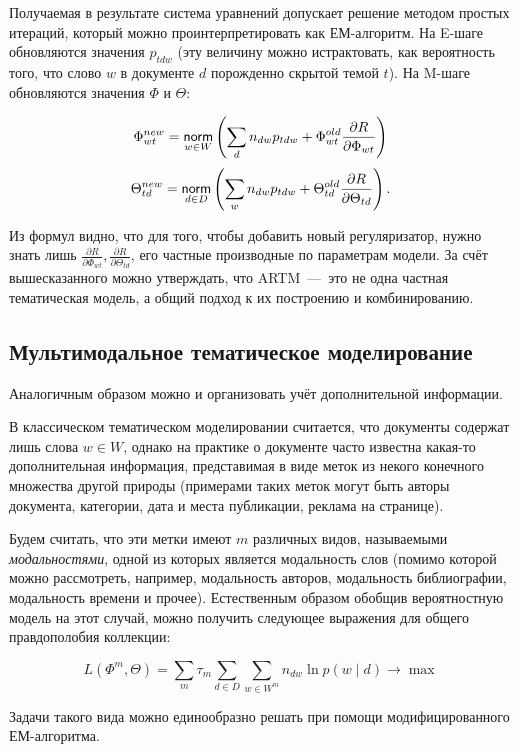 Получаемая в результате система уравнений допускает решение методом простых итераций, который можно проинтерпретировать как ЕМ-алгоритм. На E-шаге обновляются значения $p_{tdw}$ (эту величину можно истрактовать, как вероятность того, что слово $w$ в документе $d$ порожденно скрытой темой $t$). На M-шаге обновляются значения $\Phi$ и $\Theta$:

\begin{equation} \label{eq:Mstep_Theta}
\Phi_{wt}^{new} =\mathop{\mathsf{norm}}\limits_{w\in W} \left( \sum_{d} n_{dw} p_{tdw} + \Phi_{wt}^{old} \frac{\partial{R}}{\partial{\Phi_{wt}}}\right)
\end{equation}
\[
\Theta_{td}^{new}   =\mathop{\mathsf{norm}}\limits_{d\in D} \left( \sum_{w} n_{dw} p_{tdw} + \Theta_{td}^{old} \frac{\partial{R}}{\partial{\Theta_{td}}}\right).
\]
 
Из формул видно, что для того, чтобы добавить новый регуляризатор, нужно знать лишь $\frac{\partial{R}}{\partial{\Phi_{wt}}}, \frac{\partial{R}}{\partial{\Theta_{td}}}$, его частные производные по параметрам модели. За счёт вышесказанного можно утверждать, что ARTM~---~это не одна частная тематическая модель, а общий подход к их построению и комбинированию.

\subsection{Мультимодальное тематическое моделирование}

Аналогичным образом можно и организовать учёт дополнительной информации. 

В классическом тематическом моделировании считается, что документы содержат лишь слова $w \in W$, однако на практике о документе часто известна какая-то дополнительная информация, представимая в виде меток из некого конечного множества другой природы (примерами таких меток могут быть авторы документа, категории, дата и места публикации, реклама на странице). 

Будем считать, что эти метки имеют $m$ различных видов, называемыми  \textit{модальностями}, одной из которых является модальность слов (помимо которой можно рассмотреть, например, модальность авторов, модальность библиографии, модальность времени и прочее). Естественным образом обобщив вероятностную модель на этот случай, можно получить следующее выражения для общего правдополобия коллекции:

\[
L(\Phi^m, \Theta) = \sum_m \tau_m \sum_{d\in D} \sum_{w \in W^m} n_{dw} \ln p(w \mid d) \rightarrow \max
\]

Задачи такого вида можно единообразно решать при помощи модифицированного ЕМ-алгоритма.


